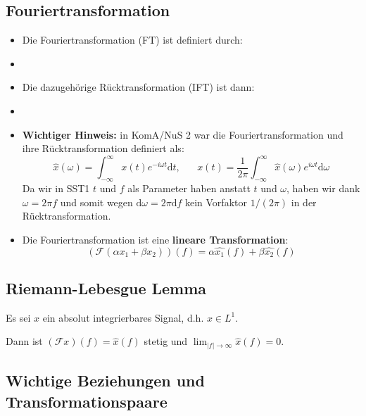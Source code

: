 \documentclass[11pt]{article}
\begin{document}
\subsection*{Fouriertransformation}
\vspace*{-0.5cm}
\begin{itemize}[leftmargin=0pt]
    \item[] Die Fouriertransformation (FT) ist definiert durch:
    \item[] %
    \item[] Die dazugehörige Rücktransformation (IFT) ist dann:
    \item[] %
\item[] \textbf{Wichtiger Hinweis:} in KomA/NuS 2 war die Fouriertransformation und ihre Rücktransformation definiert als:
$$\hat{x}(\omega) = \int_{-\infty}^{\infty} x(t) e^{-i\omega t}\text{d}t, \hspace{20pt} x(t)=\frac{1}{2\pi} \int_{-\infty}^{\infty} \hat{x}(\omega)e^{i\omega t} \text{d}\omega$$
Da wir in SST1 $t$ und $f$ als Parameter haben anstatt $t$ und $\omega$, haben wir dank $\omega = 2\pi f $ und somit wegen $\text{d}\omega = 2\pi \text{d}f$ kein Vorfaktor $1/(2\pi)$ in der Rücktransformation.
\item[] Die Fouriertransformation ist eine \textbf{lineare Transformation}:
$$(\mathcal{F}(\alpha x_1 + \beta x_2))(f) = \alpha \hat{x_1}(f) + \beta \hat{x_2}(f) $$
\end{itemize}

\pagebreak

\subsection*{Riemann-Lebesgue Lemma}
\vspace*{-0.5cm}
Es sei $x$ ein absolut integrierbares Signal, d.h. $x \in L^1$.

Dann ist $(\mathcal{F}x)(f) = \hat{x}(f)$ stetig und $\displaystyle\lim_{|f| \to \infty} \hat{x}(f) = 0$.

\subsection*{Wichtige Beziehungen und Transformationspaare}
\vspace*{-0.5cm}
\end{document}
